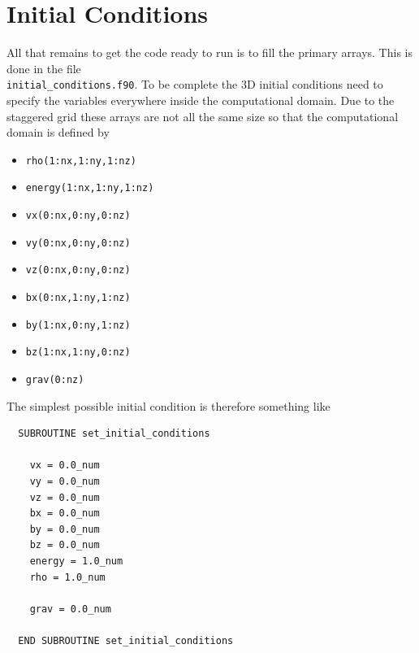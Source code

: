 \documentclass[11pt]{article}
\begin{document}
\section{Initial Conditions}
All that remains to get the code ready to run is to fill the primary arrays. This is done in the file \\ 
\texttt{initial\_conditions.f90}. To be complete the 3D initial conditions need to specify the variables everywhere 
inside the computational domain. Due to the staggered grid these arrays are not all the same size so that the 
computational domain is defined by
\begin{itemize}
\item \texttt{rho(1:nx,1:ny,1:nz)}
\item \texttt{energy(1:nx,1:ny,1:nz)}
\item \texttt{vx(0:nx,0:ny,0:nz)}
\item \texttt{vy(0:nx,0:ny,0:nz)}
\item \texttt{vz(0:nx,0:ny,0:nz)}
\item \texttt{bx(0:nx,1:ny,1:nz)}
\item \texttt{by(1:nx,0:ny,1:nz)}
\item \texttt{bz(1:nx,1:ny,0:nz)}
\item \texttt{grav(0:nz)}
\end{itemize}

The simplest possible initial condition is therefore something like
\begin{verbatim}
  SUBROUTINE set_initial_conditions

    vx = 0.0_num
    vy = 0.0_num
    vz = 0.0_num
    bx = 0.0_num
    by = 0.0_num
    bz = 0.0_num
    energy = 1.0_num
    rho = 1.0_num

    grav = 0.0_num

  END SUBROUTINE set_initial_conditions
\end{verbatim}
\end{document}
